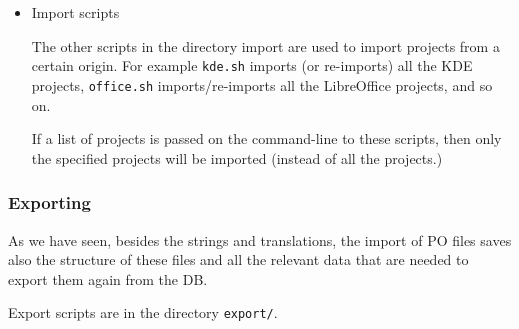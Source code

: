 \documentclass[11pt]{article}
\begin{document}
\begin{itemize}
\item Import scripts\\
\label{sec-8.4.2.4}


     The other scripts in the directory import are used to import
     projects from a certain origin. For example \texttt{kde.sh} imports (or
     re-imports) all the KDE projects, \texttt{office.sh} imports/re-imports
     all the LibreOffice projects, and so on.

     If a list of projects is passed on the command-line to these
     scripts, then only the specified projects will be imported (instead
     of all the projects.)


\end{itemize} %
\subsubsection{Exporting}
\label{sec-8.4.3}


    As we have seen, besides the strings and translations, the import of
    PO files saves also the structure of these files and all the
    relevant data that are needed to export them again from the DB.

    Export scripts are in the directory \texttt{export/}.
\end{document}
